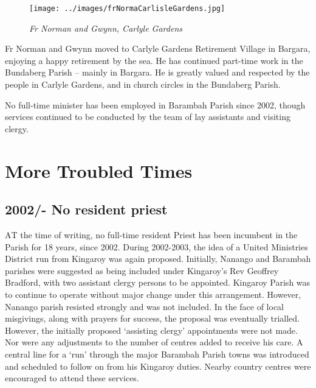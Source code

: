 \begin{figure}
\begin{center}
\texttt{[image: ../images/frNormaCarlisleGardens.jpg]}
\caption{\itshape Fr Norman and Gwynn, Carlyle Gardens}
\end{center}
\end{figure}




Fr Norman and Gwynn moved to Carlyle Gardens Retirement Village in Bargara, enjoying a happy retirement by the sea. He has continued part-time work in the Bundaberg Parish -- mainly in Bargara. He is greatly valued and respected by the people in Carlyle Gardens, and in church circles in the Bundaberg Parish.



\balance


No full-time minister has been employed in Barambah Parish since 2002, though services continued to be conducted by the team of lay assistants and visiting clergy.



\printendnotes[custom]
\setcounter{endnote}{0}




\chapter{More Troubled Times}
\nobalance


\section{2002/- No resident priest}



\lettrine[lines=3]{A}{T}
 the time of writing, no full-time resident Priest has been incumbent in the Parish for 18 years, since 2002. During 2002-2003, the idea of a United Ministries District run from Kingaroy was again proposed. Initially, Nanango and Barambah parishes were suggested as being included under Kingaroy's Rev Geoffrey Bradford, with two assistant clergy persons to be appointed. Kingaroy Parish was to continue to operate without major change under this arrangement. However, Nanango parish resisted strongly and was not included. In the face of local misgivings, along with prayers for success, the proposal was eventually trialled. However, the initially proposed `assisting clergy' appointments were not made. Nor were any adjustments to the number of centres added to receive his care. A central line for a `run' through the major Barambah Parish towns was introduced and scheduled to follow on from his Kingaroy duties. Nearby country centres were encouraged to attend these services.

